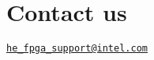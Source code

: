 \section*{Contact us}


\begin{DoxyItemize}
\item \href{mailto:he_fpga_support@intel.com}{\tt he\-\_\-fpga\-\_\-support@intel.\-com} 
\end{DoxyItemize}
